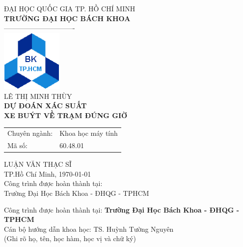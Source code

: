 \documentclass[a4paper, 13pt]{report}
\begin{document}
\newpage
{}  %
	\thisfancypage{
		\doublebox}
	{}
	
	\begin{center}
		\vspace*{0.2cm}
		ĐẠI HỌC QUỐC GIA TP. HỒ CHÍ MINH\\
		{\fontsize{14pt}{1}\textbf{		TRƯỜNG ĐẠI HỌC BÁCH KHOA }}\\
		-------------------------------\\
		\includegraphics[width=3cm]{images/bk}\\
		\vspace*{2cm}
		{\fontsize{14pt}{1}\selectfont LÊ THỊ MINH THÙY}\\
		\vspace*{2cm}
		{\fontsize{16pt}{1}\selectfont \textbf{DỰ ĐOÁN XÁC SUẤT \\XE BUÝT VỀ TRẠM ĐÚNG GIỜ}}\\
		\vspace*{2cm}
		\begin{flushleft}
		\large
		\begin{tabular}{ ll } 
        \hspace{1cm} Chuyên ngành: & Khoa học máy tính\\
		\hspace{1cm} Mã số: & 60.48.01\\
		\end{tabular}
		\end{flushleft}
		\vspace*{2cm}
		{\fontsize{14pt}{1}\selectfont LUẬN VĂN THẠC SĨ}\\
		\vspace*{2cm}
		{\fontsize{12pt}{1}	TP.Hồ Chí Minh, \today}\\
		\vspace*{2cm}
		{\fontsize{12pt}{1}	Công trình được hoàn thành tại:\\ Trường Đại Học Bách Khoa - ĐHQG - TPHCM}
	\end{center}
\pagebreak
Công trình được hoàn thành tại: \textbf{Trường Đại Học Bách Khoa - ĐHQG - TPHCM}\\
Cán bộ hướng dẫn khoa học: TS. Huỳnh Tường Nguyên	\\
	(Ghi rõ họ, tên, học hàm, học vị và chữ  ký)\\
\end{document}
